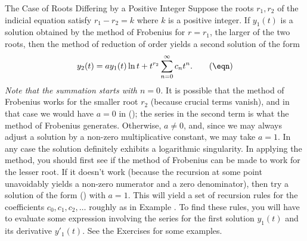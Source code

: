 \bigskip
\subhead   The Case of Roots Differing by a Positive Integer \endsubhead
Suppose the roots $r_1, r_2$ of the indicial equation satisfy
$r_1 - r_2 = k$ where $k$ is a positive integer.   If $y_1(t)$
is a solution obtained by the method of Frobenius for $r = r_1$,
the larger of the two roots, then the method of reduction of order
yields a second solution of the form
%
\nexteqn
\xdef\IntDiff{\eqn}
$$
y_2(t) = ay_1(t)\ln t + t^{r_2}\sum_{n=0}^\infty c_nt^n.\tag\eqn
$$
{\it Note that the summation starts with $n = 0$.}
It is possible that the method of Frobenius works for the
smaller root $r_2$ (because crucial terms vanish),
 and in that case we would have $a= 0$ in 
(\eqn); the series in the second term is what the method of Frobenius
generates.   Otherwise, $a\not=0$, and, since we may always
adjust a solution by a non-zero multiplicative constant,
 we may take $a = 1$. 
 In any case the solution definitely exhibits a
logarithmic singularity.   In applying the method, you should
%
first see if the method of Frobenius can be made to work for
the lesser root.  If it doesn't work (because the recursion
at some point unavoidably yields a non-zero numerator and a zero denominator),
then try a solution of the form (\IntDiff) with $a = 1$.   
This will yield a
set of recursion rules for the coefficients $c_0, c_1, c_2, \dots$
roughly as in Example \en.   To find these rules, you will have
to evaluate some expression involving the series for the first
solution $y_1(t)$ and its derivative $y'_1(t)$.   See the
Exercises for some examples.

